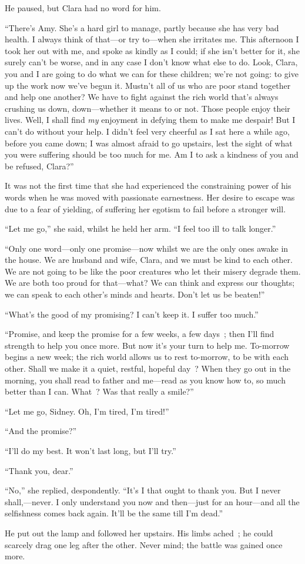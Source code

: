 He paused, but Clara had no word for him.

``There's Amy. She's a hard girl to manage, partly because she has very
bad health. I always think of that---or try to---when she irritates me.
This afternoon I took her out with me, and spoke as kindly as I could;
if she isn't better for it, she surely can't be worse, and in any case I
don't know what else to do. Look, Clara, you and I are going to do what
we can for these children; we're not going: to give up the work now
we've begun it. Mustn't all of us who are poor stand together and help
one another? We have to fight against the rich world that's always
crushing us down, down---whether it means to or not. Those people enjoy
their lives. Well, I shall find {}\emph{my} enjoyment in defying them to
make me despair! But I can't do without your help. I didn't feel very
cheerful as I sat here a while ago, before you came down; I was almost
afraid to go upstairs, lest the sight of what you were suffering should
be too much for me. Am I to ask a kindness of you and be refused,
Clara?''

It was not the first time that she had experienced the constraining
power of his words when he was moved with passionate earnestness. Her
desire to escape was due to a fear of yielding, of suffering her egotism
to fail before a stronger will.

``Let me go,'' she said, whilst he held her arm. ``I feel too ill to
talk longer.''

``Only one word---only one promise---now whilst we are the only ones
awake in the house. We are husband and wife, Clara, and we must be kind
to each other. We are not going to be like the poor creatures who let
their misery degrade them. We are both too proud for that---what? We can
think and express our thoughts; we can speak to each other's minds and
hearts. Don't let us be beaten!''

``What's the good of my promising? I can't keep it. I suffer too much.''

{} ``Promise, and keep the promise for a few weeks, a few days~; then
I'll find strength to help you once more. But now it's your turn to help
me. To-morrow begins a new week; the rich world allows us to rest
to-morrow, to be with each other. Shall we make it a quiet, restful,
hopeful day~? When they go out in the morning, you shall read to father
and me---read as you know how to, so much better than I can. What~? Was
that really a smile?''

``Let me go, Sidney. Oh, I'm tired, I'm tired!''

``And the promise?''

``I'll do my best. It won't last long, but I'll try.''

``Thank you, dear.''

``No,'' she replied, despondently. ``It's I that ought to thank you. But
I never shall,---never. I only understand you now and then---just for an
hour---and all the selfishness comes back again. It'll be the same till
I'm dead.''

He put out the lamp and followed her upstairs. His limbs ached~; he
could scarcely drag one leg after the other. Never mind; the battle was
gained once more.
